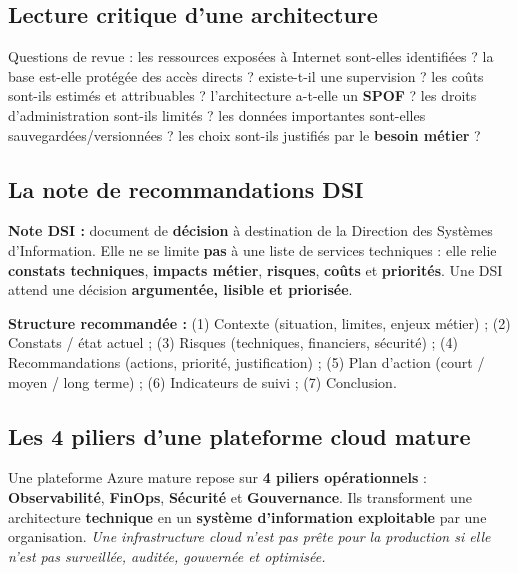 \documentclass[11pt,a4paper]{article}
\begin{document}
\subsection{Lecture critique d'une architecture}

Questions de revue : les ressources exposées à Internet sont-elles identifiées ? la base est-elle protégée des accès directs ? existe-t-il une supervision ? les coûts sont-ils estimés et attribuables ? l'architecture a-t-elle un \textbf{SPOF} ? les droits d'administration sont-ils limités ? les données importantes sont-elles sauvegardées/versionnées ? les choix sont-ils justifiés par le \textbf{besoin métier} ?

\subsection{La note de recommandations DSI}

\begin{defbox}
\textbf{Note DSI :} document de \textbf{décision} à destination de la Direction des Systèmes d'Information. Elle ne se limite \textbf{pas} à une liste de services techniques : elle relie \textbf{constats techniques}, \textbf{impacts métier}, \textbf{risques}, \textbf{coûts} et \textbf{priorités}. Une DSI attend une décision \textbf{argumentée, lisible et priorisée}.
\end{defbox}

\textbf{Structure recommandée :} (1) Contexte (situation, limites, enjeux métier) ; (2) Constats / état actuel ; (3) Risques (techniques, financiers, sécurité) ; (4) Recommandations (actions, priorité, justification) ; (5) Plan d'action (court / moyen / long terme) ; (6) Indicateurs de suivi ; (7) Conclusion.

\subsection{Les 4 piliers d'une plateforme cloud mature}

\begin{keybox}
Une plateforme Azure mature repose sur \textbf{4 piliers opérationnels} : \textbf{Observabilité}, \textbf{FinOps}, \textbf{Sécurité} et \textbf{Gouvernance}. Ils transforment une architecture \textbf{technique} en un \textbf{système d'information exploitable} par une organisation. \emph{Une infrastructure cloud n'est pas prête pour la production si elle n'est pas surveillée, auditée, gouvernée et optimisée.}
\end{keybox}
\end{document}
